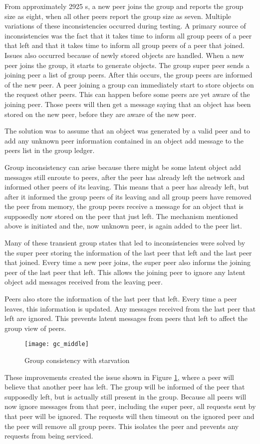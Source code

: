 From approximately 2925 s, a new peer joins the group and reports the group size as eight, when all other peers report the group size as seven. Multiple variations of these inconsistencies occurred during testing. A primary source of inconsistencies was the fact that it takes time to inform all group peers of a peer that left and that it takes time to inform all group peers of a peer that joined.
Issues also occurred because of newly stored objects are handled. When a new peer joins the group, it starts to generate objects. The group super peer sends a joining peer a list of group peers. After this occurs, the group peers are informed of the new peer. A peer joining a group can immediately start to store objects on the request other peers. This can happen before some peers are yet aware of the joining peer. Those peers will then get a message saying that an object has been stored on the new peer, before they are aware of the new peer.

The solution was to assume that an object was generated by a valid peer and to add any unknown peer information contained in an object add message to the peers list in the group ledger.

Group inconsistency can arise because there might be some latent object add messages still enroute to peers, after the peer has already left the network and informed other peers of its leaving. This means that a peer has already left, but after it informed the group peers of its leaving and all group peers have removed the peer from memory, the group peers receive a message for an object that is supposedly now stored on the peer that just left. The mechanism mentioned above is initiated and the, now unknown peer, is again added to the peer list.

Many of these transient group states that led to inconsistencies were solved by the super peer storing the information of the last peer that left and the last peer that joined. Every time a new peer joins, the super peer also informs the joining peer of the last peer that left. This allows the joining peer to ignore any latent object add messages received from the leaving peer.

Peers also store the information of the last peer that left. Every time a peer leaves, this information is updated. Any messages received from the last peer that left are ignored. This prevents latent messages from peers that left to affect the group view of peers.

\begin{figure}[htbp]
 \centering
 \texttt{[image: gc\_middle]}
 \caption{Group consistency with starvation}
 \label{fig_gc_middle}
\end{figure}
%
These improvements created the issue shown in Figure \ref{fig_gc_middle}, where a peer will believe that another peer has left. The group will be informed of the peer that supposedly left, but is actually still present in the group. Because all peers will now ignore messages from that peer, including the super peer, all requests sent by that peer will be ignored. The requests will then timeout on the ignored peer and the peer will remove all group peers. This isolates the peer and prevents any requests from being serviced.

